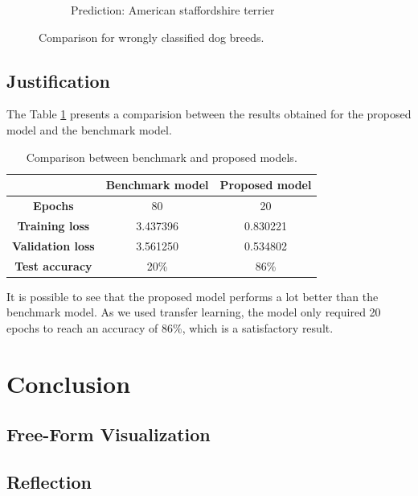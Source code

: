 \documentclass{article}
\begin{document}
\begin{figure}[htbp]
\begin{subfigure}{.45\textwidth}
            \caption{Prediction: American staffordshire terrier}
            \label{fig:american_staffy}
        \end{subfigure}
        \caption{Comparison for wrongly classified dog breeds.}
        \label{fig:comparison_wrong}
    \end{figure}

    \subsection{Justification}

    The Table \ref*{tab:results_comparison} presents a comparision between the results obtained for the proposed model and the benchmark model.

    \begin{table}[htbp]
        \centering
        \begin{tabular}{c|c|c}
             & \textbf{Benchmark model} & \textbf{Proposed model} \\
            \hline
            \textbf{Epochs} & 80 & 20 \\
            \textbf{Training loss} & 3.437396 & 0.830221 \\
            \textbf{Validation loss} & 3.561250 & 0.534802 \\
            \textbf{Test accuracy} & 20\% & 86\% \\
        \end{tabular}
        \caption{Comparison between benchmark and proposed models.}
        \label{tab:results_comparison}
    \end{table}

    It is possible to see that the proposed model performs a lot better than the benchmark model. As we used transfer learning, the model only required 20 epochs to reach an accuracy of 86\%, which is a satisfactory result.

    \section{Conclusion}

    \subsection{Free-Form Visualization}

    \subsection{Reflection}
\end{document}
